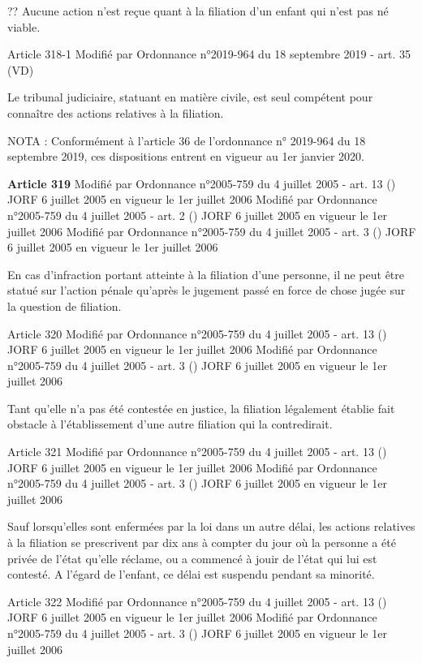 \documentclass[
  12pt,
]{book}
\begin{document}
\begin{encadre}{??}
Aucune action n'est reçue quant à la filiation d'un enfant qui n'est pas né viable.

Article 318-1
Modifié par Ordonnance n°2019-964 du 18 septembre 2019 - art. 35 (VD)

Le tribunal judiciaire, statuant en matière civile, est seul compétent pour connaître des actions relatives à la filiation.

NOTA :
Conformément à l'article 36 de l'ordonnance n° 2019-964 du 18 septembre 2019, ces dispositions entrent en vigueur au 1er janvier 2020.

\textbf{Article 319}
Modifié par Ordonnance n°2005-759 du 4 juillet 2005 - art. 13 () JORF 6 juillet 2005 en vigueur le 1er juillet 2006
Modifié par Ordonnance n°2005-759 du 4 juillet 2005 - art. 2 () JORF 6 juillet 2005 en vigueur le 1er juillet 2006
Modifié par Ordonnance n°2005-759 du 4 juillet 2005 - art. 3 () JORF 6 juillet 2005 en vigueur le 1er juillet 2006

En cas d'infraction portant atteinte à la filiation d'une personne, il ne peut être statué sur l'action pénale qu'après le jugement passé en force de chose jugée sur la question de filiation.

Article 320
Modifié par Ordonnance n°2005-759 du 4 juillet 2005 - art. 13 () JORF 6 juillet 2005 en vigueur le 1er juillet 2006
Modifié par Ordonnance n°2005-759 du 4 juillet 2005 - art. 3 () JORF 6 juillet 2005 en vigueur le 1er juillet 2006

Tant qu'elle n'a pas été contestée en justice, la filiation légalement établie fait obstacle à l'établissement d'une autre filiation qui la contredirait.

Article 321
Modifié par Ordonnance n°2005-759 du 4 juillet 2005 - art. 13 () JORF 6 juillet 2005 en vigueur le 1er juillet 2006
Modifié par Ordonnance n°2005-759 du 4 juillet 2005 - art. 3 () JORF 6 juillet 2005 en vigueur le 1er juillet 2006

Sauf lorsqu'elles sont enfermées par la loi dans un autre délai, les actions relatives à la filiation se prescrivent par dix ans à compter du jour où la personne a été privée de l'état qu'elle réclame, ou a commencé à jouir de l'état qui lui est contesté. A l'égard de l'enfant, ce délai est suspendu pendant sa minorité.

Article 322
Modifié par Ordonnance n°2005-759 du 4 juillet 2005 - art. 13 () JORF 6 juillet 2005 en vigueur le 1er juillet 2006
Modifié par Ordonnance n°2005-759 du 4 juillet 2005 - art. 3 () JORF 6 juillet 2005 en vigueur le 1er juillet 2006


\end{encadre}
\end{document}
